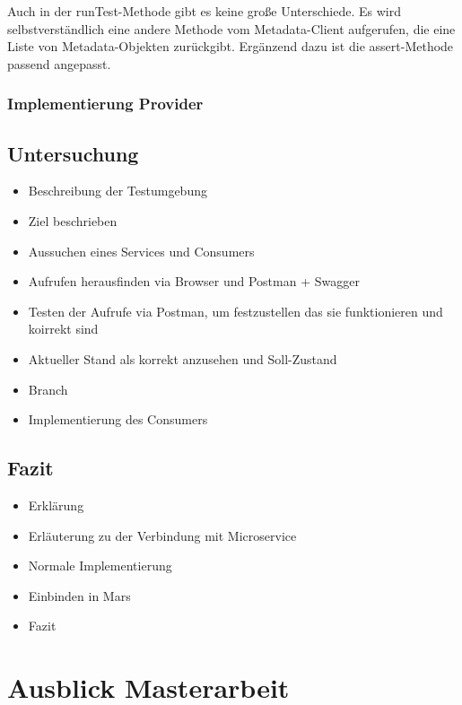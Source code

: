 \documentclass{llncs}
\begin{document}
Auch in der runTest-Methode gibt es keine große Unterschiede. Es wird selbstverständlich eine andere Methode vom Metadata-Client aufgerufen, die eine Liste von Metadata-Objekten zurückgibt. Ergänzend dazu ist die assert-Methode passend angepasst.





\subsubsection{Implementierung Provider}

\subsection{Untersuchung}


\begin{itemize}
\item Beschreibung der Testumgebung
\item Ziel beschrieben
\item Aussuchen eines Services und Consumers
\item Aufrufen herausfinden via Browser und Postman + Swagger
\item Testen der Aufrufe via Postman, um festzustellen das sie funktionieren und koirrekt sind
\item Aktueller Stand als korrekt anzusehen und Soll-Zustand
\item Branch
\item Implementierung des Consumers
\end{itemize}

\subsection{Fazit}
\begin{itemize}
\item Erklärung
\item Erläuterung zu der Verbindung mit Microservice
\item Normale Implementierung
\item Einbinden in Mars
\item Fazit
\end{itemize}
\section{Ausblick Masterarbeit}





\end{document}
